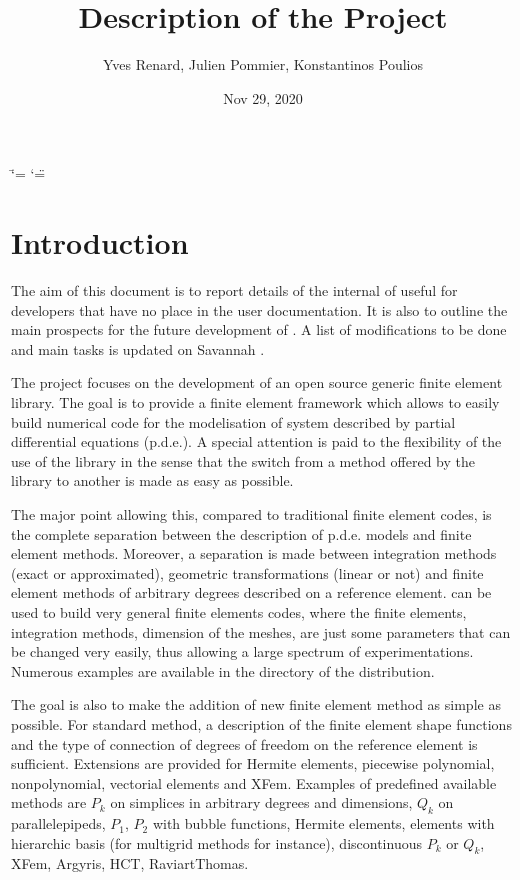\documentclass[a4paper,11pt,english]{sphinxmanual}
\title{Description of the Project}
\date{Nov 29, 2020}
\author{Yves Renard, Julien Pommier, Konstantinos Poulios}
\begin{document}
\ifdefined\shorthandoff
  \ifnum\catcode`\=\string=\active\shorthandoff{=}\fi
  \ifnum\catcode`\"=\active{}\fi
\fi

\pagestyle{empty}
\sphinxmaketitle
\pagestyle{plain}
\sphinxtableofcontents
\pagestyle{normal}
\label{\detokenize{project/index::doc}}



\chapter{Introduction}
\label{\detokenize{project/intro:introduction}}\label{\detokenize{project/intro:dp-intro}}\label{\detokenize{project/intro::doc}}
The aim of this document is to report details of the internal of 
useful for developers that have no place in the user documentation.
It is also to outline the main prospects for the future development
of . A list of modifications to be done and main tasks is updated
on Savannah .

The  project focuses on the development of an open source generic
finite element library.
The goal is to provide a finite element framework which allows to
easily build numerical code for the modelisation of system described
by partial differential equations (p.d.e.). A special attention is paid
to the flexibility of the use of the library in the sense that the
switch from a method offered by the library to another is made as easy
as possible.

The major point allowing this, compared to traditional finite element
codes, is the complete separation between the description of p.d.e.
models and finite element methods. Moreover, a separation is made
between integration methods (exact or approximated), geometric
transformations (linear or not) and finite element methods of
arbitrary degrees described on a reference element.  can
be used to build very general finite elements codes, where the
finite elements, integration methods, dimension of the meshes,
are just some parameters that can
be changed very easily, thus allowing a large spectrum of experimentations.
Numerous examples are available in the  directory of the
distribution.

The goal is also to make the addition of new finite element method
as simple as possible. For standard method, a description of the
finite element shape functions and the type of connection of degrees
of freedom on the reference element is sufficient. Extensions are
provided for Hermite elements, piecewise polynomial, non\sphinxhyphen{}polynomial,
vectorial elements and XFem. Examples of predefined
available methods are \(P_k\) on simplices in arbitrary degrees and
dimensions, \(Q_k\) on parallelepipeds, \(P_1\), \(P_2\)
with bubble functions, Hermite elements, elements with hierarchic
basis (for multigrid methods for instance),
discontinuous \(P_k\) or \(Q_k\), XFem, Argyris, HCT, Raviart\sphinxhyphen{}Thomas.
\end{document}
